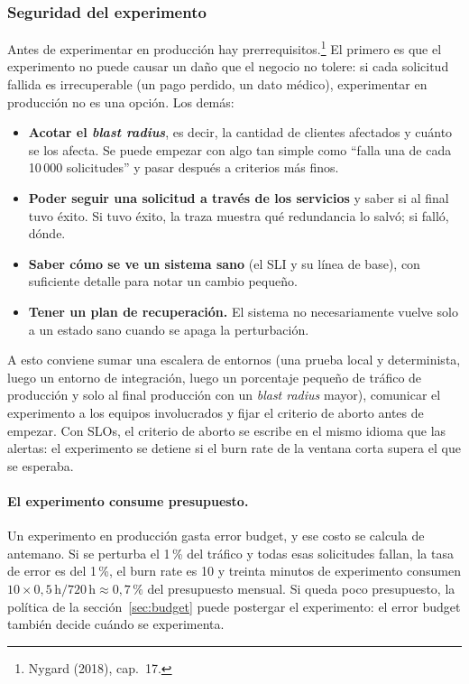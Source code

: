 \documentclass[variant=apuntes,cover=institutional,mode=screen]{ua-engineering-v6-article}
\begin{document}
\subsubsection{Seguridad del experimento}

Antes de experimentar en producción hay prerrequisitos.\footnote{Nygard (2018), cap.~17.} El primero es que el experimento no puede causar un daño que el negocio no tolere: si cada solicitud fallida es irrecuperable (un pago perdido, un dato médico), experimentar en producción no es una opción. Los demás:
\begin{itemize}
\item \textbf{Acotar el \emph{blast radius}}, es decir, la cantidad de clientes afectados y cuánto se los afecta. Se puede empezar con algo tan simple como ``falla una de cada 10\,000 solicitudes'' y pasar después a criterios más finos.
\item \textbf{Poder seguir una solicitud a través de los servicios} y saber si al final tuvo éxito. Si tuvo éxito, la traza muestra qué redundancia lo salvó; si falló, dónde.
\item \textbf{Saber cómo se ve un sistema sano} (el SLI y su línea de base), con suficiente detalle para notar un cambio pequeño.
\item \textbf{Tener un plan de recuperación.} El sistema no necesariamente vuelve solo a un estado sano cuando se apaga la perturbación.
\end{itemize}

A esto conviene sumar una escalera de entornos (una prueba local y determinista, luego un entorno de integración, luego un porcentaje pequeño de tráfico de producción y solo al final producción con un \emph{blast radius} mayor), comunicar el experimento a los equipos involucrados y fijar el criterio de aborto antes de empezar. Con SLOs, el criterio de aborto se escribe en el mismo idioma que las alertas: el experimento se detiene si el burn rate de la ventana corta supera el que se esperaba.

\paragraph{El experimento consume presupuesto.} Un experimento en producción gasta error budget, y ese costo se calcula de antemano. Si se perturba el 1\,\% del tráfico y todas esas solicitudes fallan, la tasa de error es del 1\,\%, el burn rate es 10 y treinta minutos de experimento consumen $10 \times 0{,}5\,\text{h} / 720\,\text{h} \approx 0{,}7\,\%$ del presupuesto mensual. Si queda poco presupuesto, la política de la sección~\ref{sec:budget} puede postergar el experimento: el error budget también decide cuándo se experimenta.
\end{document}
